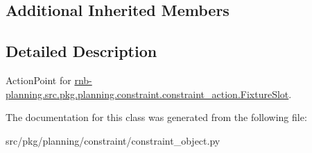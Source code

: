 \subsection*{Additional Inherited Members}


\subsection{Detailed Description}
Action\+Point for \hyperlink{classrnb-planning_1_1src_1_1pkg_1_1planning_1_1constraint_1_1constraint__action_1_1_fixture_slot}{rnb-\/planning.\+src.\+pkg.\+planning.\+constraint.\+constraint\+\_\+action.\+Fixture\+Slot}. 

The documentation for this class was generated from the following file\+:\begin{DoxyCompactItemize}
\item 
src/pkg/planning/constraint/constraint\+\_\+object.\+py\end{DoxyCompactItemize}

